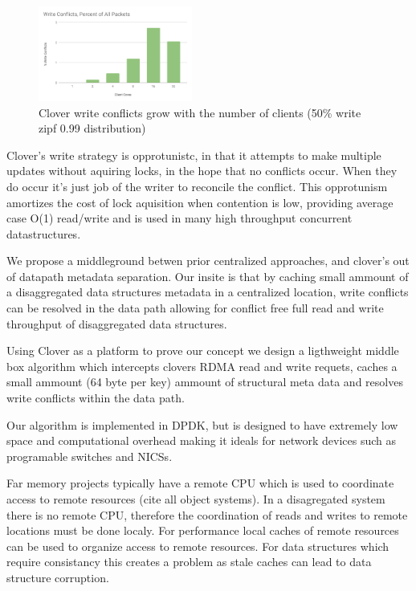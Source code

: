 \begin{figure}
    \includegraphics[width=0.45\textwidth]{fig/write_conflicts.pdf}
    \caption{Clover write conflicts grow with the number of clients
    (50\% write zipf 0.99 distribution)}
    \label{fig:conflicts}
\end{figure}


Clover's write strategy is opprotunistc, in that it attempts to make
multiple updates without aquiring locks, in the hope that no conflicts
occur. When they do occur it's just job of the writer to reconcile the
conflict. This opprotunism amortizes the cost of lock aquisition when
contention is low, providing average case O(1) read/write and is used
in many high throughput concurrent datastructures.


We propose a middleground betwen prior centralized approaches, and
clover's out of datapath metadata separation. Our insite is that by
caching small ammount of a disaggregated data structures metadata in a
centralized location, write conflicts can be resolved in the data path
allowing for conflict free full read and write throughput of
disaggregated data structures.

Using Clover as a platform to prove our concept we design a
ligthweight middle box algorithm which intercepts clovers RDMA read
and write requets, caches a small ammount (64 byte per key) ammount of
structural meta data and resolves write conflicts within the data
path. 

Our algorithm is implemented in DPDK, but is designed to have
extremely low space and computational overhead making it ideals for
network devices such as programable switches and NICSs.



\pagebreak


Far memory projects typically have a remote CPU which is used to
coordinate access to remote resources (cite all object systems). In a
disagregated system there is no remote CPU, therefore the coordination
of reads and writes to remote locations must be done localy. For
performance local caches of remote resources can be used to organize
access to remote resources. For data structures which require
consistancy this creates a problem as stale caches can lead to data
structure corruption.

